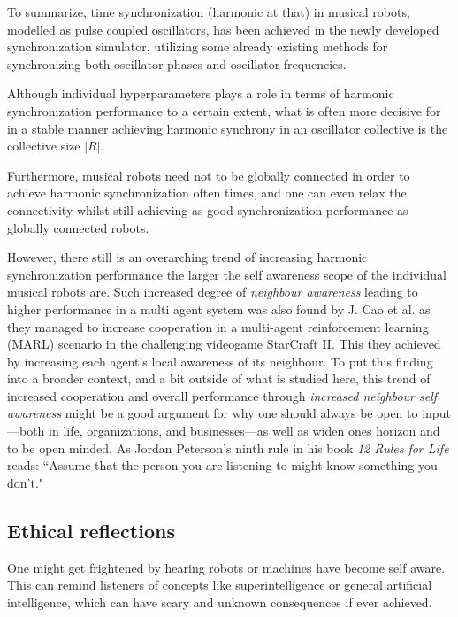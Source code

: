 	To summarize, time synchronization (harmonic at that) in musical robots, modelled as pulse coupled oscillators, has been achieved in the newly developed synchronization simulator, utilizing some already existing methods for synchronizing both oscillator phases and oscillator frequencies.
	
	Although individual hyperparameters plays a role in terms of harmonic synchronization performance to a certain extent, what is often more decisive for in a stable manner achieving harmonic synchrony in an oscillator collective is the collective size $|R|$.
	
	Furthermore, musical robots need not to be globally connected in order to achieve harmonic synchronization often times, and one can even relax the connectivity whilst still achieving as good synchronization performance as globally connected robots. 
	
	However, there still is an overarching trend of increasing harmonic synchronization performance the larger the self awareness scope of the individual musical robots are. Such increased degree of \textit{neighbour awareness} leading to higher performance in a multi agent system was also found by J. Cao et al. \cite{LINDA} as they managed to increase cooperation in a multi-agent reinforcement learning (MARL) scenario in the challenging videogame StarCraft II. This they achieved by increasing each agent's local awareness of its neighbour. To put this finding into a broader context, and a bit outside of what is studied here, this trend of increased cooperation and overall performance through \textit{increased neighbour self awareness} might be a good argument for why one should always be open to input—both in life, organizations, and businesses—as well as widen ones horizon and to be open minded. As Jordan Peterson's ninth rule in his book \textit{12 Rules for Life} reads: ``Assume that the person you are listening to might know something you don't."


	\subsection{Ethical reflections}
	
	One might get frightened by hearing robots or machines have become self aware. This can remind listeners of concepts like superintelligence or general artificial intelligence, which can have scary and unknown consequences if ever achieved.
	

